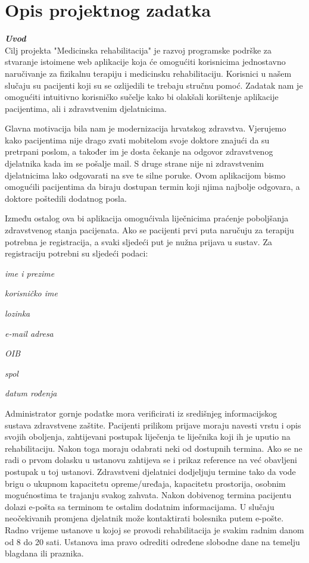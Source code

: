 \chapter{Opis projektnog zadatka}

\textbf{\textit{Uvod}}\\

Cilj projekta "Medicinska rehabilitacija" je razvoj programske podrške za stvaranje istoimene web aplikacije koja će omogućiti korisnicima jednostavno naručivanje za fizikalnu terapiju i medicinsku rehabilitaciju. Korisnici u našem slučaju su pacijenti koji su se ozlijedili te trebaju stručnu pomoć. Zadatak nam je omogućiti intuitivno korisničko sučelje kako bi olakšali korištenje aplikacije pacijentima, ali i zdravstvenim djelatnicima.

Glavna motivacija bila nam je modernizacija hrvatskog zdravstva. Vjerujemo kako pacijentima nije drago zvati mobitelom svoje doktore znajući da su pretrpani poslom, a također im je dosta čekanje na odgovor zdravstvenog djelatnika kada im se pošalje mail. S druge strane nije ni zdravstvenim djelatnicima lako odgovarati na sve te silne poruke. Ovom aplikacijom bismo omogućili pacijentima da biraju dostupan termin koji njima najbolje odgovara, a doktore poštedili dodatnog posla.

Između ostalog ova bi aplikacija omogućivala liječnicima praćenje poboljšanja zdravstvenog stanja pacijenata. Ako se pacijenti prvi puta naručuju za terapiju potrebna je registracija, a svaki sljedeći put je nužna prijava u sustav. Za registraciju potrebni su sljedeći podaci: 
\begin{packed_item}
	\item \textit{ime i prezime}
	\item \textit{korisničko ime}
	\item \textit{lozinka}
	\item \textit{e-mail adresa}
	\item \textit{OIB}
	\item \textit{spol}
	\item \textit{datum rođenja}
\end{packed_item}

Administrator gornje podatke mora verificirati iz središnjeg informacijskog sustava zdravstvene zaštite. Pacijenti prilikom prijave moraju navesti vrstu i opis svojih oboljenja, zahtijevani postupak liječenja te liječnika koji ih je uputio na rehabilitaciju. Nakon toga moraju odabrati neki od dostupnih termina. Ako se ne radi o prvom dolasku u ustanovu zahtijeva se i prikaz reference na već obavljeni postupak u toj ustanovi. Zdravstveni djelatnici dodjeljuju termine tako da vode brigu o ukupnom kapacitetu opreme/uređaja, kapacitetu prostorija, osobnim mogućnostima te trajanju svakog zahvata. Nakon dobivenog termina pacijentu dolazi e-pošta sa terminom te ostalim dodatnim informacijama. U slučaju neočekivanih promjena djelatnik može kontaktirati bolesnika putem e-pošte. Radno vrijeme ustanove u kojoj se provodi rehabilitacija je svakim radnim danom od 8 do 20 sati. Ustanova ima pravo odrediti određene slobodne dane na temelju blagdana ili praznika.\\

